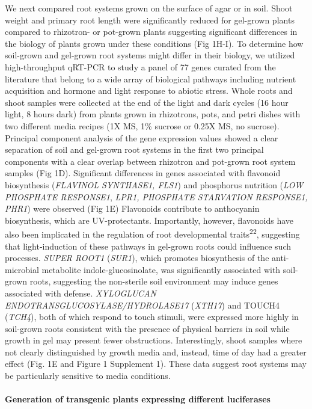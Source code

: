 \documentclass[]{article}
\begin{document}
We next compared root systems grown on the surface of agar or in soil.
Shoot weight and primary root length were significantly reduced for
gel-grown plants compared to rhizotron- or pot-grown plants suggesting
significant differences in the biology of plants grown under these
conditions (Fig 1H-I). To determine how soil-grown and gel-grown root
systems might differ in their biology, we utilized high-throughput
qRT-PCR to study a panel of 77 genes curated from the literature that
belong to a wide array of biological pathways including nutrient
acquisition and hormone and light response to abiotic stress. Whole
roots and shoot samples were collected at the end of the light and dark
cycles (16 hour light, 8 hours dark) from plants grown in rhizotrons,
pots, and petri dishes with two different media recipes (1X MS, 1\%
sucrose or 0.25X MS, no sucrose). Principal component analysis of the
gene expression values showed a clear separation of soil and gel-grown
root systems in the first two principal components with a clear overlap
between rhizotron and pot-grown root system samples (Fig 1D).
Significant differences in genes associated with flavonoid biosynthesis
(\emph{FLAVINOL SYNTHASE1, FLS1}) and phosphorus nutrition (\emph{LOW
PHOSPHATE RESPONSE1}, \emph{LPR1, PHOSPHATE STARVATION RESPONSE1, PHR1})
were observed (Fig 1E) Flavonoids contribute to anthocyanin
biosynthesis, which are UV-protectants. Importantly, however, flavonoids
have also been implicated in the regulation of root developmental
traits\textsuperscript{22}, suggesting that light-induction of these
pathways in gel-grown roots could influence such processes. \emph{SUPER
ROOT1} (\emph{SUR1}), which promotes biosynthesis of the anti-microbial
metabolite indole-glucosinolate, was significantly associated with
soil-grown roots, suggesting the non-sterile soil environment may induce
genes associated with defense. \emph{XYLOGLUCAN
ENDOTRANSGLUCOSYLASE/HYDROLASE17} (\emph{XTH17}) and TOUCH4
(\emph{TCH4}), both of which respond to touch stimuli, were expressed
more highly in soil-grown roots consistent with the presence of physical
barriers in soil while growth in gel may present fewer obstructions.
Interestingly, shoot samples where not clearly distinguished by growth
media and, instead, time of day had a greater effect (Fig. 1E and Figure
1 Supplement 1). These data suggest root systems may be particularly
sensitive to media conditions.

\paragraph{Generation of transgenic plants expressing different
luciferases}\label{generation-of-transgenic-plants-expressing-different-luciferases}
\end{document}
